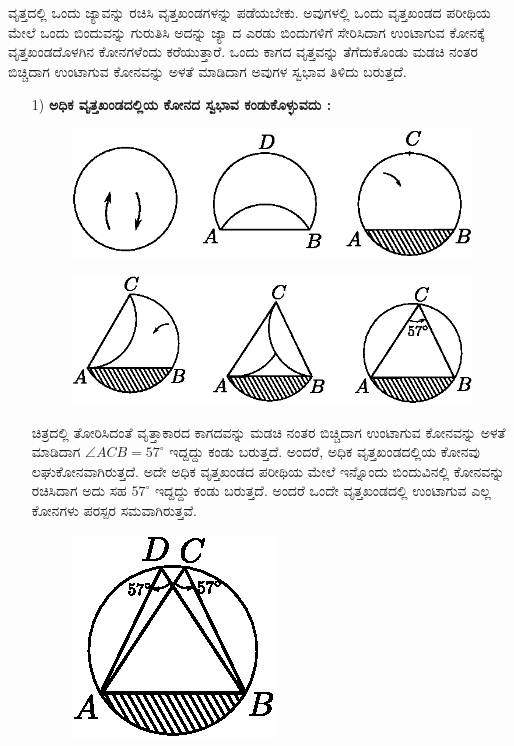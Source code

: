   ವೃತ್ತದಲ್ಲಿ ಒಂದು ಜ್ಯಾವನ್ನು ರಚಿಸಿ ವೃತ್ತಖಂಡಗಳನ್ನು ಪಡೆಯಬೇಕು. ಅವುಗಳಲ್ಲಿ ಒಂದು ವೃತ್ತಖಂಡದ ಪರೀಥಿಯ ಮೇಲೆ ಒಂದು ಬಿಂದುವನ್ನು ಗುರುತಿಸಿ ಅದನ್ನು ಜ್ಯಾ ದ ಎರಡು ಬಿಂದುಗಳಿಗೆ ಸೇರಿಸಿದಾಗ ಉಂಟಾಗುವ ಕೋನಕ್ಕೆ ವೃತ್ತಖಂಡದೊಳಗಿನ ಕೋನಗಳೆಂದು ಕರೆಯುತ್ತಾರೆ. ಒಂದು ಕಾಗದ ವೃತ್ತವನ್ನು ತೆಗೆದುಕೊಂಡು ಮಡಚಿ ನಂತರ ಬಿಚ್ಚಿದಾಗ ಉಂಟಾಗುವ ಕೋನವನ್ನು ಅಳತೆ ಮಾಡಿದಾಗ ಅವುಗಳ ಸ್ವಭಾವ ತಿಳಿದು ಬರುತ್ತದೆ. 
    \begin{itemize}
  \item[1)] \textbf{ಅಧಿಕ ವೃತ್ತಖಂಡದಲ್ಲಿಯ ಕೋನದ ಸ್ವಭಾವ ಕಂಡುಕೊಳ್ಳುವದು :}
  \begin{figure}[H]
\centering
\includegraphics[scale=.98]{src/figure/chap1/fig1-29a.eps}
\end{figure}
\begin{figure}[H]
\centering
\includegraphics[scale=.98]{src/figure/chap1/fig1-29b.eps}
\end{figure}
 
 ಚಿತ್ರದಲ್ಲಿ ತೋರಿಸಿದಂತೆ ವೃತ್ತಾಕಾರದ ಕಾಗದವನ್ನು ಮಡಚಿ ನಂತರ ಬಿಚ್ಚಿದಾಗ ಉಂಟಾಗುವ ಕೋನವನ್ನು ಅಳತೆ ಮಾಡಿದಾಗ $\angle ACB = 57^\circ$ ಇದ್ದದ್ದು ಕಂಡು ಬರುತ್ತದೆ. ಅಂದರೆ, ಅಧಿಕ ವೃತ್ತಖಂಡದಲ್ಲಿಯ ಕೋನವು ಲಘುಕೋನವಾಗಿರುತ್ತದೆ. ಅದೇ ಅಧಿಕ ವೃತ್ತಖಂಡದ ಪರೀಥಿಯ ಮೇಲೆ ಇನ್ನೊಂದು ಬಿಂದುವಿನಲ್ಲಿ ಕೋನವನ್ನು ರಚಿಸಿದಾಗ ಅದು ಸಹ $57^\circ$ ಇದ್ದದ್ದು ಕಂಡು ಬರುತ್ತದೆ. ಅಂದರೆ ಒಂದೇ ವೃತ್ತಖಂಡದಲ್ಲಿ ಉಂಟಾಗುವ ಎಲ್ಲ ಕೋನಗಳು ಪರಸ್ಪರ ಸಮವಾಗಿರುತ್ತವೆ. 
 \begin{figure}[H]
\centering
\includegraphics[scale=.98]{src/figure/chap1/fig1-29c.eps}
\end{figure}


\end{itemize}
